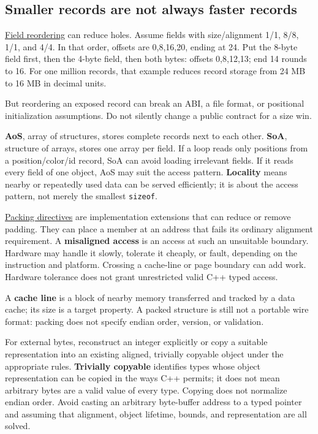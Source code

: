 \subsection{Smaller records are not always faster records}\label{01-foundations-i-ch002-smaller-records-are-not-always-faster-records}

\hyperref[appendix-5522ad176ca0]{Field reordering} can reduce holes. Assume fields with size/alignment 1/1, 8/8, 1/1, and 4/4. In that order, offsets are 0,8,16,20, ending at 24. Put the 8-byte field first, then the 4-byte field, then both bytes: offsets 0,8,12,13; end 14 rounds to 16. For one million records, that example reduces record storage from 24 MB to 16 MB in decimal units.

But reordering an exposed record can break an ABI, a file format, or positional initialization assumptions. Do not silently change a public contract for a size win.

\textbf{AoS}, array of structures, stores complete records next to each other. \textbf{SoA}, structure of arrays, stores one array per field. If a loop reads only positions from a position/color/id record, SoA can avoid loading irrelevant fields. If it reads every field of one object, AoS may suit the access pattern. \textbf{Locality} means nearby or repeatedly used data can be served efficiently; it is about the access pattern, not merely the smallest \texttt{sizeof}.

\hyperref[appendix-0682dbfc5f0e]{Packing directives} are implementation extensions that can reduce or remove padding. They can place a member at an address that fails its ordinary alignment requirement. A \textbf{misaligned access} is an access at such an unsuitable boundary. Hardware may handle it slowly, tolerate it cheaply, or fault, depending on the instruction and platform. Crossing a cache-line or page boundary can add work. Hardware tolerance does not grant unrestricted valid C++ typed access.

A \textbf{cache line} is a block of nearby memory transferred and tracked by a data cache; its size is a target property. A packed structure is still not a portable wire format: packing does not specify endian order, version, or validation.

For external bytes, reconstruct an integer explicitly or copy a suitable representation into an existing aligned, trivially copyable object under the appropriate rules. \textbf{Trivially copyable} identifies types whose object representation can be copied in the ways C++ permits; it does not mean arbitrary bytes are a valid value of every type. Copying does not normalize endian order. Avoid casting an arbitrary byte-buffer address to a typed pointer and assuming that alignment, object lifetime, bounds, and representation are all solved.

